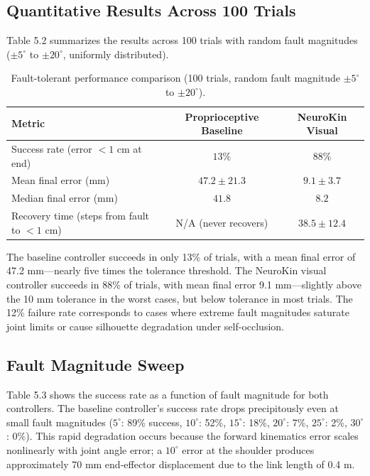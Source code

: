 \documentclass[12pt,a4paper,oneside]{report}
\begin{document}
\subsection{Quantitative Results Across 100 Trials}

Table 5.2 summarizes the results across 100 trials with random fault magnitudes ($\pm5^\circ$ to $\pm20^\circ$, uniformly distributed).

\begin{table}[H]
\centering
\caption{Fault-tolerant performance comparison (100 trials, random fault magnitude $\pm5^\circ$ to $\pm20^\circ$).}
\label{tab:fault_performance_ch5}
\begin{tabular}{lcc}
\toprule
\textbf{Metric} & \textbf{Proprioceptive Baseline} & \textbf{NeuroKin Visual} \\
\midrule
Success rate (error $<1$ cm at end) & $13\%$ & $88\%$ \\
Mean final error (mm) & $47.2 \pm 21.3$ & $9.1 \pm 3.7$ \\
Median final error (mm) & $41.8$ & $8.2$ \\
Recovery time (steps from fault to $<1$ cm) & N/A (never recovers) & $38.5 \pm 12.4$ \\
\bottomrule
\end{tabular}
\end{table}

The baseline controller succeeds in only 13\% of trials, with a mean final error of 47.2 mm---nearly five times the tolerance threshold. The NeuroKin visual controller succeeds in 88\% of trials, with mean final error 9.1 mm---slightly above the 10 mm tolerance in the worst cases, but below tolerance in most trials. The 12\% failure rate corresponds to cases where extreme fault magnitudes saturate joint limits or cause silhouette degradation under self-occlusion.

\subsection{Fault Magnitude Sweep}

Table 5.3 shows the success rate as a function of fault magnitude for both controllers. The baseline controller's success rate drops precipitously even at small fault magnitudes ($5^\circ$: 89\% success, $10^\circ$: 52\%, $15^\circ$: 18\%, $20^\circ$: 7\%, $25^\circ$: 2\%, $30^\circ$: 0\%). This rapid degradation occurs because the forward kinematics error scales nonlinearly with joint angle error; a $10^\circ$ error at the shoulder produces approximately 70 mm end-effector displacement due to the link length of 0.4 m.
\end{document}
